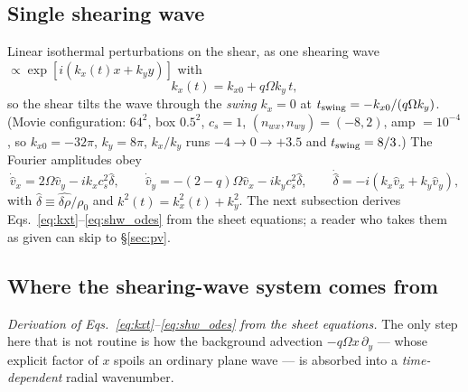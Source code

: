 \documentclass[11pt]{article}
\begin{document}
\subsection{Single shearing wave}
Linear isothermal perturbations on the shear, as one shearing wave
$\propto \exp[i(k_x(t)x + k_y y)]$ with
\begin{equation}
k_x(t) = k_{x0} + q\Omega k_y\,t ,
\label{eq:kxt}
\end{equation}
so the shear tilts the wave through the \emph{swing} $k_x = 0$ at
$t_{\rm swing} = -k_{x0}/(q\Omega k_y)$. (Movie configuration:
$64^2$, box $0.5^2$, $c_s = 1$, $(n_{wx}, n_{wy}) = (-8, 2)$, amp $=10^{-4}$,
so $k_{x0} = -32\pi$, $k_y = 8\pi$, $k_x/k_y$ runs $-4 \to 0 \to +3.5$ and
$t_{\rm swing} = 8/3$.) The Fourier amplitudes obey
\begin{equation}
\dot{\hat v}_x = 2\Omega\hat v_y - i k_x c_s^2\hat\delta,\qquad
\dot{\hat v}_y = -(2{-}q)\Omega\hat v_x - i k_y c_s^2\hat\delta,\qquad
\dot{\hat\delta} = -i(k_x\hat v_x + k_y\hat v_y),
\label{eq:shw_odes}
\end{equation}
with $\hat\delta \equiv \widehat{\delta\rho}/\rho_0$ and
$k^2(t) = k_x^2(t) + k_y^2$. The next subsection derives
Eqs.~\eqref{eq:kxt}--\eqref{eq:shw_odes} from the sheet equations; a reader who
takes them as given can skip to \S\ref{sec:pv}.

\subsection{Where the shearing-wave system comes from}
\label{sec:shw_deriv}
\noindent\emph{Derivation of Eqs.~\eqref{eq:kxt}--\eqref{eq:shw_odes} from the
sheet equations.} The only step here that is not routine is how the background
advection
$-q\Omega x\,\partial_y$ --- whose explicit factor of $x$ spoils an ordinary
plane wave --- is absorbed into a \emph{time-dependent} radial wavenumber.
\end{document}
